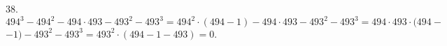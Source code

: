 38. $494^3-494^2-494\cdot493-493^2-493^3=494^2\cdot(494-1)-494\cdot493-493^2-493^3=494\cdot493\cdot(494-$\\$-1)-493^2-493^3=
493^2\cdot(494-1-493)=0.$\\
